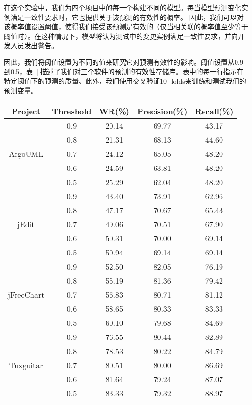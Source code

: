 {

在这个实验中，我们为四个项目中的每一个构建不同的模型。每当模型预测变化实例满足一致性要求时，它也提供关于该预测的有效性的概率。 因此，我们可以对该概率值设置阈值，使得我们接受该预测是有效的（仅当相关联的概率值至少等于阈值时）。在这种情况下，模型将认为测试中的变更实例满足一致性要求，并向开发人员发出警告。

因此，我们将阈值设置为不同的值来研究它对预测有效性的影响。阈值设置从0.9到0.5，表~\ref{}描述了我们对三个软件的预测的有效性存储库。表中的每一行指示在特定阈值下的预测的质量。此外，我们使用交叉验证$ 10 $ -folds来训练和测试我们的预测变量。

\begin{table}[htbp]
\vspace{0.5em}\centering\wuhao
\begin{tabular}{ccccc}
\toprule[1.5pt]
\textbf{Project}&\textbf{Threshold}&\textbf{WR(\%)}&\textbf{Precision(\%)}&\textbf{Recall(\%)}\\

\midrule[1pt]
 \multirow{5}{*}{ArgoUML}
&0.9&	20.14&	69.77&	43.17\\
&0.8&	21.31&	68.13&	44.60\\
&0.7&	24.12&	65.05&	48.20\\
&0.6&	24.59&	63.81&	48.20\\
&0.5&	25.29&	62.04&	48.20\\
\hline
\multirow{5}{*}{jEdit}
&0.9&	43.40&	73.91&	62.96\\
&0.8&	47.17&	70.67&	65.43\\
&0.7&	49.06&	70.51&	67.90\\
&0.6&	50.31&	70.00&	69.14\\
&0.5&	50.94&	69.14&	69.14\\
\hline
\multirow{5}{*}{jFreeChart}
&0.9&	52.50&	82.05&	76.19\\
&0.8&	55.19&	81.36&	79.42\\
&0.7&	56.83&	80.71&	81.12\\
&0.6&	58.65&	80.33&	83.33\\
&0.5&	60.10&	79.68&	84.69\\
\hline
\multirow{5}{*}{Tuxguitar}
&0.9	&76.55&   80.44&	82.89\\
&0.8	&78.53&	80.22&	84.79\\
&0.7	&80.51&	80.00&	86.69\\
&0.6	&81.64&	79.24&	87.07\\
&0.5    &83.33&	79.32&	88.97\\
\bottomrule[1.5pt]
\end{tabular}
\end{table}

}
